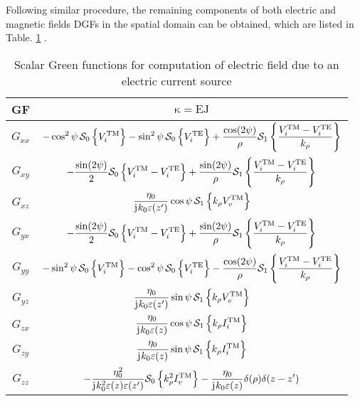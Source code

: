 \documentclass[12pt]{article}
\begin{document}
Following similar procedure, the remaining components of both electric and magnetic fields DGFs in the spatial domain can be obtained, which are listed in Table. \ref{tab:EJ} \cite{Michalski2005}.
%
\begin{table}[!ht]
  \begin{center}
    \begin{tabular}{|| c | c ||}
      \hline
      GF & $\mathrm{\kappa} = \mathrm{EJ}$ \\ [0.5ex]
      \hline\hline
      $G_{xx}$ & $ \displaystyle - \cos^2 \psi \, \mathcal{S}_0 \left \{ V_i^\mathrm{TM} \right \} - \sin^2 \psi \, \mathcal{S}_0 \left \{ V_i^\mathrm{TE} \right \} + \frac{ \cos (2 \psi)}{\rho} \mathcal{S}_1 \left \{ \frac{V_i^\mathrm{TM} - V_i^\mathrm{TE}}{k_{\rho}} \right \}$ \\ [2.5ex]
      $G_{xy}$ & $ \displaystyle - \frac{\sin (2 \psi)}{2} \mathcal{S}_0 \left \{ {V_i^\mathrm{TM} - V_i^\mathrm{TE}} \right \} + \frac{\sin (2 \psi)}{\rho} \mathcal{S}_1 \left \{ \frac{V_i^\mathrm{TM} - V_i^\mathrm{TE}}{k_{\rho}} \right \}$ \\ [2.5ex]
      $G_{xz}$ & $ \displaystyle \frac{\eta_0}{\mathrm{j}\mkern1mu k_0 \varepsilon(z')} \cos \psi \,  \mathcal{S}_1 \left \{ {k_{\rho} V_v^\mathrm{TM}} \right \}$ \\ [2.5ex]
      $G_{yx}$ & $ \displaystyle - \frac{\sin (2 \psi)}{2} \mathcal{S}_0 \left \{ {V_i^\mathrm{TM} - V_i^\mathrm{TE}} \right \} + \frac{\sin (2 \psi)}{\rho} \mathcal{S}_1 \left \{ \frac{V_i^\mathrm{TM} - V_i^\mathrm{TE}}{k_{\rho}} \right \}$  \\ [2.5ex]
      $G_{yy}$ & $ \displaystyle - \sin^2 \psi \, \mathcal{S}_0 \left \{ V_i^\mathrm{TM} \right \} - \cos^2 \psi \, \mathcal{S}_0 \left \{ V_i^\mathrm{TE} \right \} - \frac{ \cos (2 \psi)}{\rho} \mathcal{S}_1 \left \{ \frac{V_i^\mathrm{TM} - V_i^\mathrm{TE}}{k_{\rho}} \right \}$ \\ [2.5ex]
      $G_{yz}$ & $\displaystyle \frac{\eta_0}{\mathrm{j}\mkern1mu k_0 \varepsilon(z')} \sin \psi \,  \mathcal{S}_1 \left \{ {k_{\rho} V_v^\mathrm{TM}} \right \}$  \\ [2.5ex]
      $G_{zx}$ & $\displaystyle \frac{\eta_0}{\mathrm{j}\mkern1mu k_0 \varepsilon(z)} \cos \psi \,  \mathcal{S}_1 \left \{ {k_{\rho} I_i^\mathrm{TM}} \right \}$    \\ [2.5ex]
      $G_{zy}$ & $\displaystyle \frac{\eta_0}{\mathrm{j}\mkern1mu k_0 \varepsilon(z)} \sin \psi \,  \mathcal{S}_1 \left \{ {k_{\rho} I_i^\mathrm{TM}} \right \}$   \\ [2.5ex]
      $G_{zz}$ & $\displaystyle -\frac{\eta_0^2}{\mathrm{j}\mkern1mu k_0^2 \varepsilon(z) \varepsilon(z')} \mathcal{S}_0 \left \{ {k^2_{\rho} I_v^\mathrm{TM}} \right \} - \frac{\eta_0}{\mathrm{j}\mkern1mu k_0 \varepsilon(z)} \delta(\mathbf{\rho}) \delta(z -z')$  \\ [2.5ex]
      \hline
    \end{tabular}
  \end{center}
  \caption{Scalar Green functions for computation of electric field due to an electric current source \cite{Michalski2005}}
  \label{tab:EJ}
\end{table}
\end{document}
